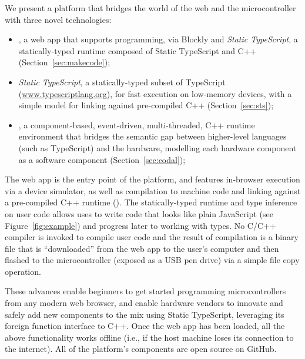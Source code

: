 We present a platform that bridges the world of the web and the microcontroller with three
novel technologies:
\begin{itemize}
\item \emph{\MCN}, a web app that supports programming, via Blockly and {\em Static TypeScript},
a statically-typed runtime composed of Static TypeScript and C++ (Section~\ref{sec:makecode});

\item \emph{Static TypeScript}, a statically-typed subset of TypeScript 
(\url{www.typescriptlang.org}), for fast execution on low-memory devices, with
a simple model for linking against pre-compiled C++ (Section~\ref{sec:sts});

\item \emph{\CO}, a component-based, event-driven, multi-threaded, C++ runtime environment 
that bridges the semantic gap between higher-level languages (such as TypeScript) and the hardware,
modelling each hardware component as a software component (Section~\ref{sec:codal});

\end{itemize}
The \MC web app is the entry point of the platform, and features
in-browser execution via a device simulator, 
as well as compilation to machine code and linking against a pre-compiled C++ runtime (\emph{\CON}). 
The statically-typed runtime and type inference on user code allows uses to write code
that looks like plain JavaScript (see Figure~\ref{fig:example}) and progress later to working 
with types.
No C/C++ compiler is invoked to compile user code and the result of compilation is a 
binary file that is ``downloaded'' from the web app to the user's
computer and then flashed to the microcontroller (exposed as a USB pen drive)
via a simple file copy operation.

These advances enable beginners to get started programming microcontrollers from
any modern web browser, and enable hardware vendors to innovate and safely add new
components to the mix using Static TypeScript, leveraging its
foreign function interface to C++.
Once the web app has been loaded, all the above functionality works offline
(i.e., if the host machine loses its connection
to the internet). All of the platform's components are open source on GitHub.

